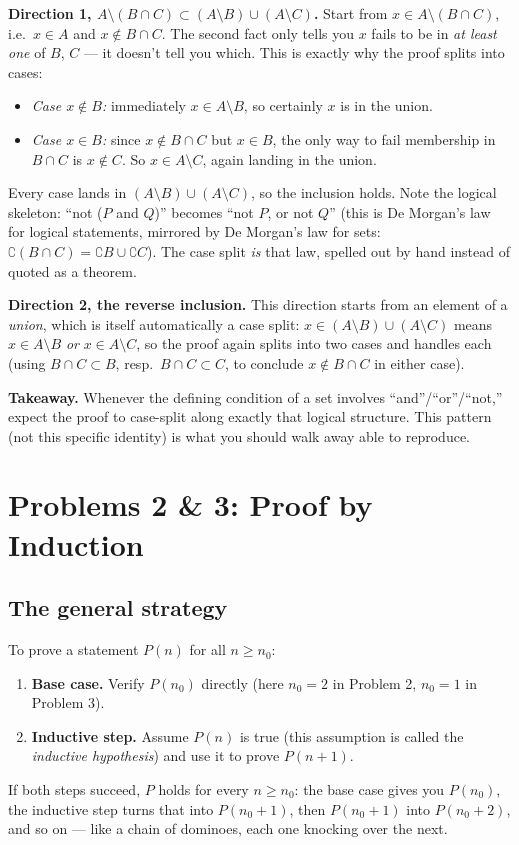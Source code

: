 \documentclass[11pt]{article}
\begin{document}
\textbf{Direction 1, $A\setminus(B\cap C) \subset (A\setminus B)\cup(A\setminus C)$.}
Start from $x \in A\setminus (B\cap C)$, i.e.\ $x\in A$ and
$x \notin B\cap C$. The second fact only tells you $x$ fails to be in
\emph{at least one} of $B$, $C$ --- it doesn't tell you which. This is
exactly why the proof splits into cases:
\begin{itemize}
  \item \emph{Case $x\notin B$:} immediately $x \in A\setminus B$, so
        certainly $x$ is in the union.
  \item \emph{Case $x \in B$:} since $x \notin B\cap C$ but $x\in B$, the
        only way to fail membership in $B\cap C$ is $x\notin C$. So
        $x \in A\setminus C$, again landing in the union.
\end{itemize}
Every case lands in $(A\setminus B)\cup(A\setminus C)$, so the
inclusion holds. Note the logical skeleton: ``not ($P$ and $Q$)''
becomes ``not $P$, or not $Q$'' (this is De Morgan's law for logical
statements, mirrored by De Morgan's law for sets:
$\complement(B\cap C) = \complement B \cup \complement C$). The
case split \emph{is} that law, spelled out by hand instead of quoted
as a theorem.

\textbf{Direction 2, the reverse inclusion.} This direction starts from
an element of a \emph{union}, which is itself automatically a case
split: $x \in (A\setminus B)\cup(A\setminus C)$ means $x\in A\setminus B$
\emph{or} $x \in A\setminus C$, so the proof again splits into two
cases and handles each (using $B\cap C \subset B$, resp.\ $B \cap C
\subset C$, to conclude $x \notin B\cap C$ in either case).

\textbf{Takeaway.} Whenever the defining condition of a set involves
``and''/``or''/``not,'' expect the proof to case-split along exactly
that logical structure. This pattern (not this specific identity)
is what you should walk away able to reproduce.

\section*{Problems 2 \& 3: Proof by Induction}

\subsection*{The general strategy}
To prove a statement $P(n)$ for all $n \ge n_0$:
\begin{enumerate}
  \item \textbf{Base case.} Verify $P(n_0)$ directly (here $n_0=2$ in
        Problem 2, $n_0=1$ in Problem 3).
  \item \textbf{Inductive step.} Assume $P(n)$ is true (this assumption
        is called the \emph{inductive hypothesis}) and use it to prove
        $P(n+1)$.
\end{enumerate}
If both steps succeed, $P$ holds for every $n\ge n_0$: the base case
gives you $P(n_0)$, the inductive step turns that into $P(n_0+1)$, then
$P(n_0+1)$ into $P(n_0+2)$, and so on --- like a chain of dominoes,
each one knocking over the next.
\end{document}
